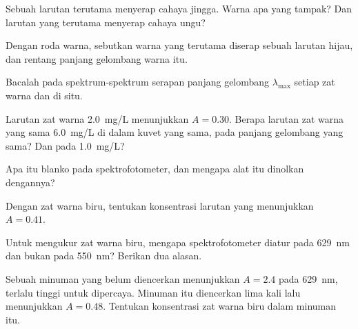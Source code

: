\begin{exercise}[$\star$]\label{exo:g11:absorbance:1}
Sebuah larutan terutama menyerap cahaya jingga. Warna apa yang tampak?
Dan larutan yang terutama menyerap cahaya ungu?
\end{exercise}

\begin{exercise}[$\star$]\label{exo:g11:absorbance:2}
Dengan roda warna, sebutkan warna yang terutama diserap sebuah larutan
hijau, dan rentang panjang gelombang warna itu.
\end{exercise}

\begin{exercise}[$\star$]\label{exo:g11:absorbance:3}
Bacalah pada spektrum-spektrum serapan panjang gelombang $\lambda_{\max}$
setiap zat warna dan  di situ.
\end{exercise}

\begin{exercise}[$\star$]\label{exo:g11:absorbance:4}
Larutan zat warna \qty{2.0}{mg/L} menunjukkan $A = 0.30$. Berapa
 larutan zat warna yang sama \qty{6.0}{mg/L} di dalam kuvet yang
sama, pada panjang gelombang yang sama? Dan pada \qty{1.0}{mg/L}?
\end{exercise}

\begin{exercise}[$\star$]\label{exo:g11:absorbance:5}
Apa itu blanko pada spektrofotometer, dan mengapa alat itu dinolkan
dengannya?
\end{exercise}

\begin{exercise}[$\star\star$]\label{exo:g11:absorbance:6}
Dengan  zat warna biru, tentukan konsentrasi larutan yang
menunjukkan $A = 0.41$.
\end{exercise}

\begin{exercise}[$\star\star$]\label{exo:g11:absorbance:7}
Untuk mengukur zat warna biru, mengapa spektrofotometer diatur pada
\qty{629}{nm} dan bukan pada \qty{550}{nm}? Berikan dua alasan.
\end{exercise}

\begin{exercise}[$\star\star$]\label{exo:g11:absorbance:8}
Sebuah minuman yang belum diencerkan menunjukkan $A = 2.4$ pada
\qty{629}{nm}, terlalu tinggi untuk dipercaya. Minuman itu diencerkan
lima kali lalu menunjukkan $A = 0.48$. Tentukan konsentrasi zat warna
biru dalam minuman itu.
\end{exercise}

